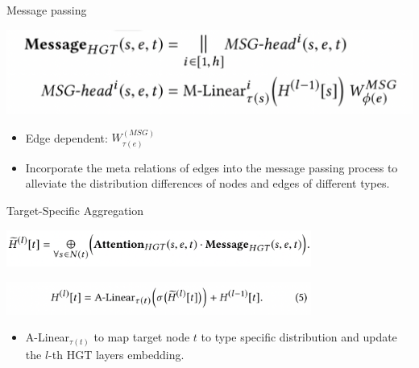 \documentclass[aspectratio=1610,hyperref={colorlinks,unicode,linkcolor=blue,anchorcolor=blue,citecolor=blue,filecolor=black,urlcolor=blue}]{beamer}
\begin{document}
\begin{frame}[label={sec:org3d00681}]{Message passing}
\begin{center}
\includegraphics[width=.9\linewidth]{./p5.png}
\end{center}

\begin{itemize}
\item Edge dependent: \(W^{(MSG)} _{\tau(e)}\)
\item Incorporate the meta relations of edges into the message passing
process to alleviate the distribution differences of nodes and edges
of different types.
\end{itemize}
\end{frame}

\begin{frame}[label={sec:org155b484}]{Target-Specific Aggregation}
\begin{center}
\includegraphics[width=10cm]{./p6.png}
\end{center}
\begin{center}
\includegraphics[width=10cm]{./p6-2.png}
\end{center}

\begin{itemize}
\item A-Linear\(_{\tau(t)}\) to map target node \(t\) to type specific
distribution and update the \(l\)-th HGT layers embedding.
\end{itemize}
\end{frame}
\end{document}
